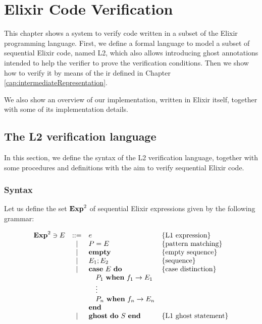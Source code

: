 \chapter{Elixir Code Verification}
\label{cap:elixirCodeVerification}


This chapter shows a system to verify code written in a subset of the Elixir 
programming language.  First, we define a formal language to model a subset of
sequential Elixir code, named L2, which also allows introducing ghost
annotations intended to help the verifier to prove the verification conditions.
Then we show how to verify it by means of the \gls{ir} defined in Chapter
\ref{cap:intermediateRepresentation}.

We also show an overview of our implementation, written in Elixir itself,
together with some of its implementation details.

\section{The L2 verification language}

In this section, we define the syntax of the L2 verification language, together
with some procedures and definitions with the aim to verify sequential Elixir
code.

\subsection{Syntax}

Let us define the set $\mathbf{Exp}^{2}$ of sequential Elixir expressions given by the 
following grammar:

\[
\begin{array}{rcll}
\mathbf{Exp}^{2} \ni E & ::= & e & \{ \textrm{L1 expression} \} \\
& | & P = E & \{ \textrm{pattern matching} \} \\
& | & \textbf{empty} & \{ \textrm{empty sequence} \} \\
& | & E_1; E_2 & \{ \textrm{sequence} \} \\
& | & \textbf{case}~E~\textbf{do} & \{ \textrm{case distinction} \} \\
& & \quad P_1~\textbf{when}~f_1 \rightarrow E_1 \\
& & \quad \vdots\\
& & \quad P_n~\textbf{when}~f_n \rightarrow E_n \\
& & \textbf{end} \\
& | & \textbf{ghost}~\textbf{do}~S~\textbf{end} & \{ \textrm{L1 ghost statement} \} \\
\end{array}
\]

